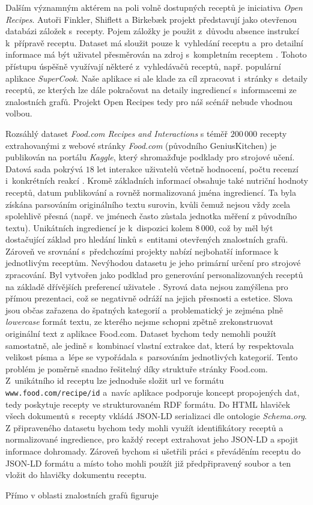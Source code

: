 Dalším významným aktérem na poli volně dostupných receptů je iniciativa \emph{Open Recipes}. Autoři Finkler, Shiflett a Birkebæk projekt představují jako otevřenou databázi záložek s~recepty. Pojem záložky je použit z~důvodu absence instrukcí k~přípravě receptu. Dataset má sloužit pouze k~vyhledání receptu a~pro detailní informace má být uživatel přesměrován na zdroj s~kompletním receptem \citep{open-recipes}. Tohoto přístupu úspěšně využívají některé z~vyhledávačů receptů, např. populární aplikace \emph{SuperCook}. Naše aplikace si ale klade za cíl zpracovat i~stránky s~detaily receptů, ze kterých lze dále pokračovat na detaily ingrediencí s~informacemi ze znalostních grafů. Projekt Open Recipes tedy pro náš scénář nebude vhodnou volbou.

Rozsáhlý dataset \emph{Food.com Recipes and Interactions} s téměř $200\,000$ recepty extrahovanými z webové stránky \emph{Food.com} (původního GeniusKitchen) je publikován na portálu \emph{Kaggle}, který shromažďuje podklady pro strojové učení. Datová sada pokrývá $18$ let interakce uživatelů včetně hodnocení, počtu recenzí i~konkrétních reakcí \citep{shuyang_li_2019}. Kromě základních informací obsahuje také nutriční hodnoty receptů, datum publikování a rovněž normalizovaná jména ingrediencí. Ta byla získána parsováním originálního textu surovin, kvůli čemuž nejsou vždy zcela spolehlivě přesná (např. ve jménech často zůstala jednotka měření z původního textu). Unikátních ingrediencí je k~dispozici kolem $8\,000$, což by měl být dostačující základ pro hledání linků s~entitami otevřených znalostních grafů. Zároveň ve srovnání s~předchozími projekty nabízí nejbohatší informace k jednotlivým receptům. Nevýhodou datasetu je jeho primární určení pro strojové zpracování. Byl vytvořen jako podklad pro generování personalizovaných receptů na základě dřívějších preferencí uživatele \citep{majumder-etal-2019-generating}. Syrová data nejsou zamýšlena pro přímou prezentaci, což se negativně odráží na jejich přesnosti a estetice. Slova jsou občas zařazena do špatných kategorií a~problematický je zejména plně \emph{lowercase} formát textu, ze kterého nejsme schopni zpětně zrekonstruovat originální text z aplikace Food.com. Dataset bychom tedy nemohli použít samostatně, ale jedině s~kombinací vlastní extrakce dat, která by respektovala velikost písma a~lépe se vypořádala s~parsováním jednotlivých kategorií.
Tento problém je poměrně snadno řešitelný díky struktuře stránky Food.com. Z~unikátního id receptu lze jednoduše složit url ve formátu \texttt{www.food.com/recipe/id} a~navíc aplikace podporuje koncept propojených dat, tedy poskytuje recepty ve strukturovaném RDF formátu. Do HTML hlaviček všech dokumentů s~recepty vkládá JSON-LD serializaci dle ontologie \emph{Schema.org}. Z připraveného datasetu bychom tedy mohli využít identifikátory receptů a normalizované ingredience, pro každý recept extrahovat jeho JSON-LD a spojit informace dohromady. Zároveň bychom si ušetřili práci s převáděním receptu do JSON-LD formátu a místo toho mohli použít již předpřipravený soubor a ten vložit do hlavičky dokumentu receptu.

Přímo v oblasti znalostních grafů figuruje 